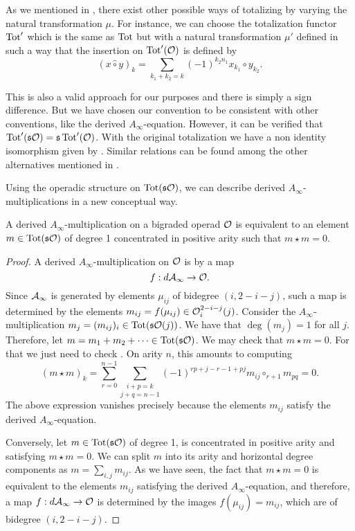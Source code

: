 \documentclass[Thesis.tex]{subfiles}
\begin{document}
\begin{remark}\label{othermu}
As we mentioned in , there exist other possible ways of totalizing by varying the natural transformation $\mu$. For instance, we can choose the totalization functor $\operatorname{Tot}'$ which is the same as $\operatorname{Tot}$ but with a natural transformation $\mu'$ defined in such a way that the insertion on $\operatorname{Tot}'({\mathcal O})$ is defined by \[(x\hat{\circ}y)_k=\sum_{k_1+k_2=k}(-1)^{k_2n_1}x_{k_1}\circ y_{k_2}.\] 

This is also a valid approach for our purposes and there is simply a sign difference. But we have chosen our convention to be consistent with other conventions, like the derived $A_\infty$-equation. However, it can be verified that $\operatorname{Tot}'(\mathfrak{s}{\mathcal O})=\mathfrak{s} \operatorname{Tot}'({\mathcal O})$. With the original totalization we have a non identity isomorphism given by . Similar relations can be found among the other alternatives mentioned in . %



\end{remark}


Using the operadic structure on $\operatorname{Tot}(\mathfrak{s}{\mathcal O})$, we can describe derived $A_\infty$-multiplications in a new conceptual way.

\begin{lem}\label{mstar}
A derived $A_\infty$-multiplication on a bigraded operad ${\mathcal O}$ is equivalent to an element $m\in\operatorname{Tot}(\mathfrak{s}{\mathcal O})$ of degree 1 concentrated in positive arity such that $m\star m = 0$. 
\end{lem}
\begin{proof}
A derived $A_\infty$-multiplication on ${\mathcal O}$ is by  a map 
\[f:d\mathcal{A}_\infty\to{\mathcal O}.\]
Since $\mathcal{A}_\infty$ is generated by elements $\mu_{ij}$ of bidegree $(i,2-i-j)$, such a map is determined by the elements $m_{ij}=f(\mu_{ij})\in{\mathcal O}^{2-i-j}_i(j)$. Consider the $A_\infty$-multiplication $m_j = (m_{ij})_i\in\operatorname{Tot}(\mathfrak{s}{\mathcal O}(j))$. We have that $\deg(m_j)=1$ for all $j$. Therefore, let $m=m_1+m_2+\cdots\in\operatorname{Tot}(\mathfrak{s}{\mathcal O})$. We may check that $m\star m=0$. For that we just need to check . On arity $n$, this amounts to computing
\[(m\star m)_k = \sum_{r=0}^{n-1}\underset{j+q=n-1}{\sum_{i+p=k}}(-1)^{rp+j-r-1+ pj}m_{ij}\circ_{r+1}m_{pq}=0.\]
The above expression vanishes precisely because the elements $m_{ij}$ satisfy the derived $A_\infty$-equation.

Conversely, let $m\in\operatorname{Tot}(\mathfrak{s}{\mathcal O})$ of degree 1, is concentrated in positive arity and satisfying $m\star m=0$. We can split $m$ into its arity and horizontal degree components as $m=\sum_{i,j}m_{ij}$. As we have seen, the fact that $m\star m=0$ is equivalent to the elements $m_{ij}$ satisfying the derived $A_\infty$-equation, and therefore, a map $f:d\mathcal{A}_\infty\to{\mathcal O}$ is determined by the images $f(\mu_{ij})=m_{ij}$, which are of bidegree $(i,2-i-j)$. 
\end{proof}
\end{document}
